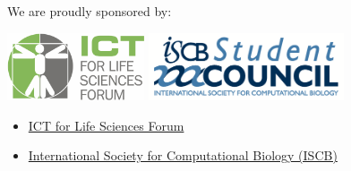 \documentclass[12pt,]{article}
\begin{document}
We are proudly sponsored by:

 \vspace{2ex}
\includegraphics[height=20mm]{./images/ICT-for-Life-Sciences-Forum-logo.png}\quad
\includegraphics[height=20mm]{./images/ISCBSC-logo.png}

\begin{itemize}
\itemsep1pt\parskip0pt
\item
  \href{http://www.ict4lifesciences.org.au}{ICT for Life Sciences Forum}
\item
  \href{http://www.iscb.org}{International Society for Computational
  Biology (ISCB)}
\end{itemize}

\vfill
\end{document}
